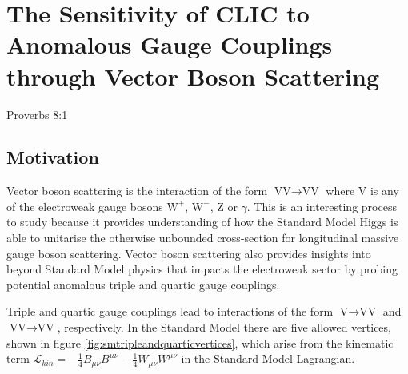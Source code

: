 \chapter{The Sensitivity of CLIC to Anomalous Gauge Couplings through Vector Boson Scattering}
\label{chap:PhysicsAnalysis}

%
{Proverbs 8:1}


\section{Motivation}
Vector boson scattering is the interaction of the form $\text{VV} \rightarrow \text{VV}$ where V is any of the electroweak gauge bosons $\text{W}^{+}$, $\text{W}^{-}$, Z or $\gamma$.  This is an interesting process to study because it provides understanding of how the Standard Model Higgs is able to unitarise the otherwise unbounded cross-section for longitudinal massive gauge boson scattering.  Vector boson scattering also provides insights into beyond Standard Model physics that impacts the electroweak sector by probing potential anomalous triple and quartic gauge couplings.  

Triple and quartic gauge couplings lead to interactions of the form $\text{V} \rightarrow \text{VV}$ and $\text{VV} \rightarrow \text{VV}${,} respectively.  In the Standard Model there are five allowed vertices, shown in figure \ref{fig:smtripleandquarticvertices}, which arise from the kinematic term $\mathcal{L}_{kin} = -\frac{1}{4}B_{\mu\nu}B^{\mu\nu} - \frac{1}{4}W_{\mu\nu}W^{\mu\nu}$ in the Standard Model Lagrangian.

